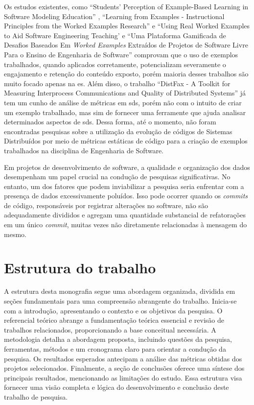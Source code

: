 Os estudos existentes, como ``Students' Perception of Example-Based Learning in Software Modeling Education'' \cite{Tiago.Bonetti-etal:2023}, ``Learning from Examples - Instructional Principles from the Worked Examples Research'' \cite{Robert.Atkinson-etal:2000} e ``Using Real Worked Examples to Aid Software Engineering Teaching' \cite{Simone.Tonhao-etal:2021} e ``Uma Plataforma Gamificada de Desafios Baseados Em \textit{Worked Examples} Extraídos de Projetos de Software Livre Para o Ensino de Engenharia de Software'' \cite{Simone.Tonhao-etal:2022} comprovam que o uso de exemplos trabalhados, quando aplicados corretamente, potencializam severamente o engajamento e retenção do conteúdo exposto, porém maioria desses trabalhos são muito focado apenas na \gls{es}. Além disso, o trabalho ``DistFax - A Toolkit for Measuring Interprocess Communications and Quality of Distributed Systems''\cite{DistFax} já tem um cunho de análise de métricas em \gls{sds}, porém não com o intuito de criar um exemplo trabalhado, mas sim de fornecer uma ferramente que ajuda analisar determinados aspectos de \gls{sds}. Dessa forma, até o momento, não foram encontradas pesquisas sobre a utilização da evolução de códigos de Sistemas Distribuídos por meio de métricas estáticas de código para a criação de exemplos trabalhados na disciplina de Engenharia de Software.

Em projetos de desenvolvimento de software, a qualidade e organização dos dados desempenham um papel crucial na condução de pesquisas significativas. No entanto, um dos fatores que podem inviabilizar a pesquisa seria enfrentar com a presença de dados excessivamente poluídos. Isso pode ocorrer quando os \textit{commits} de código, responsáveis por registrar alterações no software, não são adequadamente divididos e agregam uma quantidade substancial de refatorações em um único \textit{commit}, muitas vezes não diretamente relacionadas à mensagem do mesmo.

\section{Estrutura do trabalho}
\label{sec:estruturaTrabalho}

A estrutura desta monografia segue uma abordagem organizada, dividida em seções fundamentais para uma compreensão abrangente do trabalho. Inicia-se com a introdução, apresentando o contexto e os objetivos da pesquisa. O referencial teórico abrange a fundamentação teórica essencial e revisão de trabalhos relacionados, proporcionando a base conceitual necessária. A metodologia detalha a abordagem proposta, incluindo questões da pesquisa, ferramentas, métodos e um cronograma claro para orientar a condução da pesquisa. Os resultados esperados antecipam a análise das métricas obtidas dos projetos selecionados. Finalmente, a seção de conclusões oferece uma síntese dos principais resultados, mencionando as limitações do estudo. Essa estrutura visa fornecer uma visão completa e lógica do desenvolvimento e conclusão deste trabalho de pesquisa.
